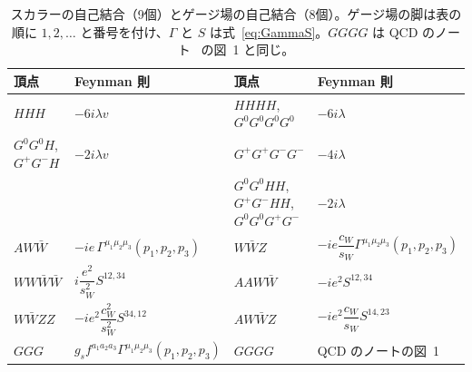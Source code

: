 \documentclass[a4paper,10pt]{ltjsarticle}
\newcommand{\sw}{s_W}
\newcommand{\cw}{c_W}
\begin{document}
\begin{table}[tbp]
\centering\small\renewcommand{\arraystretch}{1.75}
\caption{スカラーの自己結合（9個）とゲージ場の自己結合（8個）。ゲージ場の脚は表の順に $1,2,\dots$ と番号を付け、$\Gamma$ と $S$ は式~\eqref{eq:GammaS}。$GGGG$ は QCD のノート~\cite{qcdnote} の図~1 と同じ。}
\label{tab:rules-sv}
\begin{tabular}{llll}
\toprule
頂点 & Feynman 則 & 頂点 & Feynman 則 \\
\midrule
$HHH$ & $-6i\lambda v$ & $HHHH$, $G^0G^0G^0G^0$ & $-6i\lambda$ \\
$G^0G^0H$, $G^+G^-H$ & $-2i\lambda v$ & $G^+G^+G^-G^-$ & $-4i\lambda$ \\
 & & $G^0G^0HH$, $G^+G^-HH$, $G^0G^0G^+G^-$ & $-2i\lambda$ \\
\midrule
$AW\bar W$ & $-ie\,\Gamma^{\mu_1\mu_2\mu_3}(p_1,p_2,p_3)$ & $W\bar WZ$ & $-ie\dfrac{\cw}{\sw}\Gamma^{\mu_1\mu_2\mu_3}(p_1,p_2,p_3)$ \\
$WW\bar W\bar W$ & $i\dfrac{e^2}{\sw^2}S^{12,34}$ & $AAW\bar W$ & $-ie^2S^{12,34}$ \\
$W\bar WZZ$ & $-ie^2\dfrac{\cw^2}{\sw^2}S^{34,12}$ & $AW\bar WZ$ & $-ie^2\dfrac{\cw}{\sw}S^{14,23}$ \\
$GGG$ & $g_sf^{a_1a_2a_3}\Gamma^{\mu_1\mu_2\mu_3}(p_1,p_2,p_3)$ & $GGGG$ & QCD のノートの図~1 \\
\bottomrule
\end{tabular}
\end{table}
\end{document}
